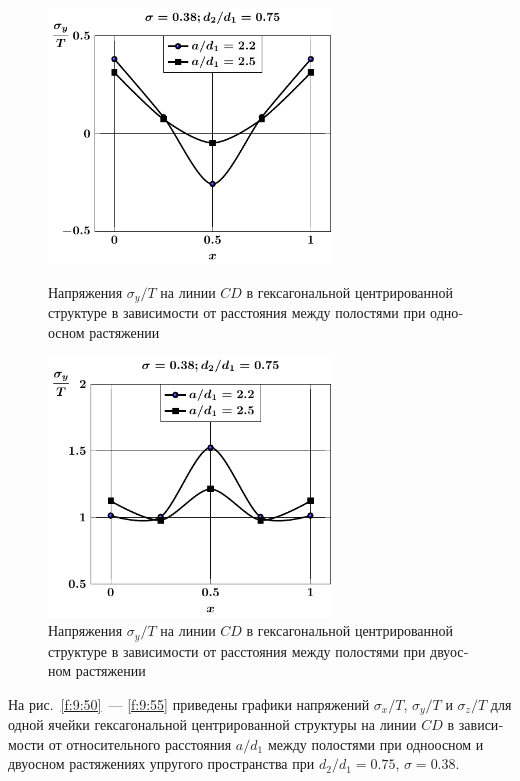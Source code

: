 \begin{russian}
\begin{figure}[h!]
\centering\footnotesize
\parbox[b]{7.5cm}{\centering\includegraphics[width=7.5cm]{cav13-a-d75-t1-sig_y-cd.pdf}
\caption{Напряжения $\sigma_y/T$ на линии $CD$ в гексагональной центрированной структуре в зависимости от расстояния между полостями при одноосном растяжении 
\label{f:9:52}}}\hfil\hfil
\parbox[b]{7.5cm}{\centering\includegraphics[width=7.5cm]{cav13-a-d75-t2-sig_y-cd.pdf}
\caption{Напряжения $\sigma_y/T$ на линии $CD$ в гексагональной центрированной структуре в зависимости от расстояния между полостями при двуосном растяжении
\label{f:9:53}}}
\end{figure}

На рис.~\ref{f:9:50}~--- \ref{f:9:55} приведены графики напряжений $\sigma_x/T$, $\sigma_y/T$ и $\sigma_z/T$ для одной ячейки гексагональной центрированной структуры на линии $CD$ в зависимости от относительного расстояния $a/d_1$ между полостями при одноосном и двуосном растяжениях упругого пространства при $d_2/d_1=0.75$, $\sigma=0.38$.


\end{russian}
